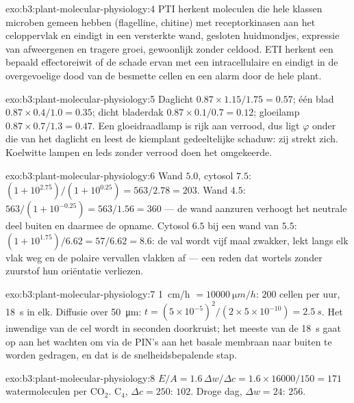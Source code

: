 \begin{solution}{exo:b3:plant-molecular-physiology:4}
PTI herkent moleculen die hele klassen microben gemeen hebben
(flagelline, chitine) met receptorkinasen aan het celoppervlak en
eindigt in een versterkte wand, gesloten huidmondjes, expressie van
afweergenen en tragere groei, gewoonlijk zonder celdood. ETI herkent
een bepaald effectoreiwit of de schade ervan met een intracellulaire
 en eindigt in de overgevoelige dood van de besmette cellen
en een alarm door de hele plant.
\end{solution}

\begin{solution}{exo:b3:plant-molecular-physiology:5}
Daglicht $0.87\times 1.15/1.75 = 0.57$; één blad $0.87\times 0.4/1.0 =
0.35$; dicht bladerdak $0.87\times 0.1/0.7 = 0.12$; gloeilamp
$0.87\times 0.7/1.3 = 0.47$. Een gloeidraadlamp is rijk aan verrood,
dus ligt $\varphi$ onder die van het daglicht en leest de kiemplant
gedeeltelijke schaduw: zij strekt zich. Koelwitte lampen en leds zonder
verrood doen het omgekeerde.
\end{solution}

\begin{solution}{exo:b3:plant-molecular-physiology:6}
Wand $5.0$, cytosol $7.5$: $(1 + 10^{2.75})/(1 + 10^{0.25}) = 563/2.78
= 203$. Wand $4.5$: $563/(1 + 10^{-0.25}) = 563/1.56 = 360$ --- de wand
aanzuren verhoogt het neutrale deel buiten en daarmee de opname.
Cytosol $6.5$ bij een wand van $5.5$: $(1 + 10^{1.75})/6.62 = 57/6.62 = 8.6$:
de val wordt vijf maal zwakker,  lekt langs elk vlak weg en de
polaire vervallen vlakken af --- een reden dat wortels zonder zuurstof
hun oriëntatie verliezen.
\end{solution}

\begin{solution}{exo:b3:plant-molecular-physiology:7}
\qty{1}{cm/h} $= \qty{10000}{\micro m/h}$: $200$ cellen per uur,
\qty{18}{s} in elk. Diffusie over \qty{50}{\micro m}: $t =
(5\times 10^{-5})^{2}/(2\times 5\times 10^{-10}) = \qty{2.5}{s}$. Het
inwendige van de cel wordt in seconden doorkruist; het meeste van de
\qty{18}{s} gaat op aan het wachten om via de PIN's aan het basale
membraan naar buiten te worden gedragen, en dat is de
snelheidsbepalende stap.
\end{solution}

\begin{solution}{exo:b3:plant-molecular-physiology:8}
$E/A = 1.6\,\Delta w/\Delta c = 1.6\times\num{16000}/150 = 171$
watermoleculen per CO$_{2}$. C$_{4}$, $\Delta c = 250$: $102$. Droge
dag, $\Delta w = 24$: $256$.
\end{solution}

